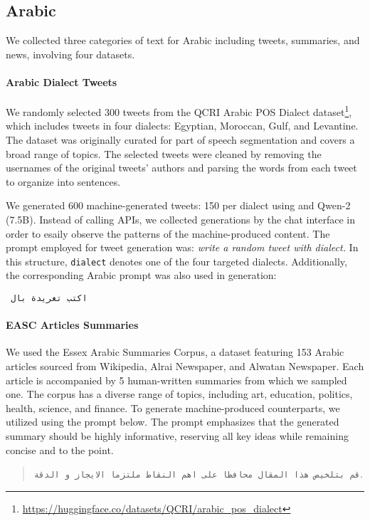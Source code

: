 \subsection{Arabic}
We collected three categories of text for Arabic including tweets, summaries, and news, involving four datasets.

\paragraph{Arabic Dialect Tweets}
We randomly selected 300 tweets from the QCRI Arabic POS Dialect dataset\footnote{\url{https://huggingface.co/datasets/QCRI/arabic_pos_dialect}}, which includes tweets in four dialects: Egyptian, Moroccan, Gulf, and Levantine. The dataset was originally curated for part of speech segmentation and covers a broad range of topics. The selected tweets were cleaned by removing the usernames of the original tweets' authors and parsing the words from each tweet to organize into sentences.

We generated 600 machine-generated tweets: 150 per dialect using \gptfouro and Qwen-2 (7.5B). Instead of calling APIs, we collected generations by the chat interface in order to esaily observe the patterns of the machine-produced content. The prompt employed for tweet generation was: \textit{write a random tweet with \texttt{}{dialect}.} In this structure, \texttt{dialect} denotes one of the four targeted dialects. Additionally, the corresponding Arabic prompt was also used in generation: 
\begin{RLtext} \texttt{ اكتب تغريدة بال}\end{RLtext}


\paragraph{EASC Articles Summaries}
We used the Essex Arabic Summaries Corpus, a dataset featuring 153 Arabic articles sourced from Wikipedia, Alrai Newspaper, and Alwatan Newspaper. Each article is accompanied by 5 human-written summaries from which we sampled one. The corpus has a diverse range of topics, including art, education, politics, health, science, and finance. To generate machine-produced counterparts, we utilized \gptfouro using the prompt below. The prompt emphasizes that the generated summary should be highly informative, reserving all key ideas while remaining concise and to the point.
\begin{quote}
    \small
    \begin{RLtext}
            \texttt{قم بتلخيص هذا المقال محافظا على اهم النقاط ملتزما الايجاز و الدقة}.
    \end{RLtext}

\end{quote}


